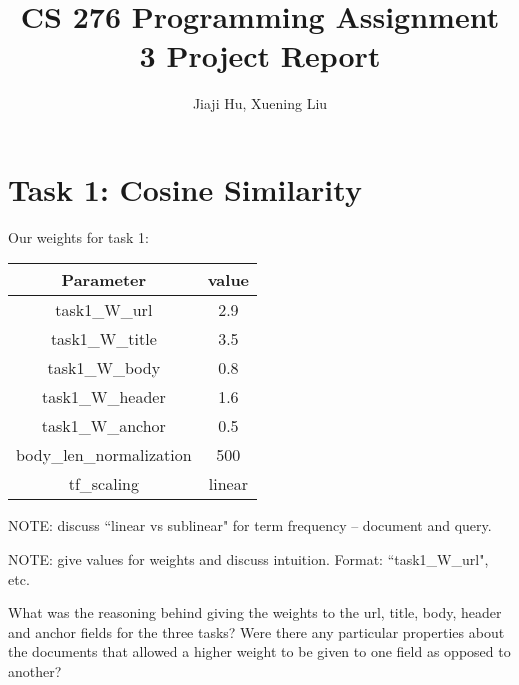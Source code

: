\documentclass[10pt,twocolumn]{article}
\begin{document}
\title{CS 276 Programming Assignment 3 Project Report}
\author{Jiaji Hu, Xuening Liu}
\date{}
\maketitle

\section{Task 1: Cosine Similarity}

Our weights for task 1:
\begin{table}[H]
\centering
\begin{tabular}{|c|c|}
\hline
Parameter & value \\\hline
task1\_W\_url & 2.9\\\hline
task1\_W\_title & 3.5\\\hline
task1\_W\_body & 0.8\\\hline
task1\_W\_header & 1.6\\\hline
task1\_W\_anchor & 0.5\\\hline
body\_len\_normalization & 500\\\hline
tf\_scaling & linear\\\hline
\end{tabular}
\end{table}
NOTE: discuss ``linear vs sublinear" for term frequency -- document and query.

NOTE: give values for weights and discuss intuition. Format: ``task1\_W\_url", etc.

What was the reasoning behind giving the weights to the url, title,
body, header and anchor fields for the three tasks? Were there any
particular properties about the documents that allowed a higher weight
to be given to one field as opposed to another?
\end{document}
